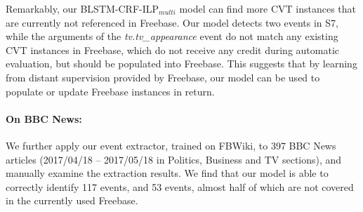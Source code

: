 Remarkably, our BLSTM-CRF-ILP$_{multi}$ model can find more CVT instances that are currently not referenced in Freebase. Our model detects two events in S7, while the arguments of the \textit{tv.tv\_appearance} event do not match any existing CVT instances in Freebase, which do not receive any credit during automatic evaluation, but should be populated into Freebase. %
This  suggests that by learning from distant supervision provided by Freebase, our model can be used to populate or update Freebase instances in return.


\paragraph{On BBC News:}
We further apply our event extractor, trained on FBWiki, to 397 BBC News
articles (2017/04/18 -- 2017/05/18 in Politics, Business and TV sections), and manually examine the extraction results. We find that our model is able to correctly identify 117 events, and 53 events,
almost half of which are not covered in the currently used Freebase.



